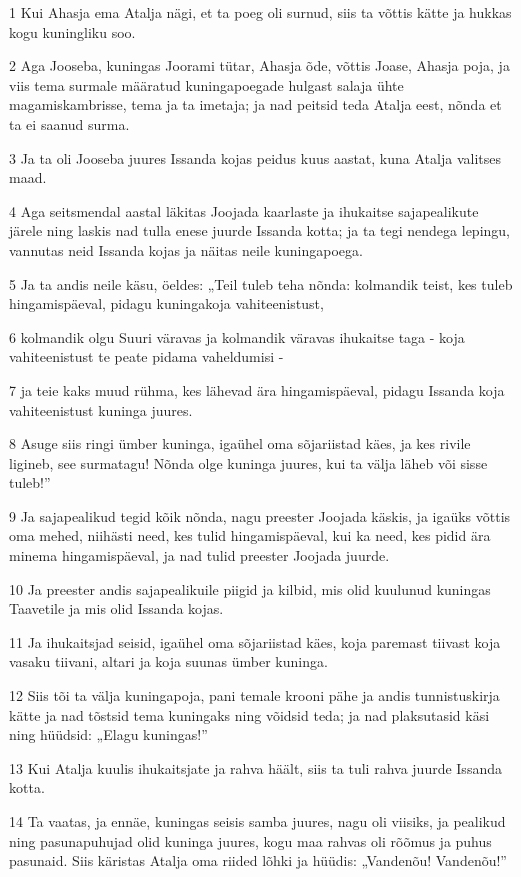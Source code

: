 \par 1 Kui Ahasja ema Atalja nägi, et ta poeg oli surnud, siis ta võttis kätte ja hukkas kogu kuningliku soo.
\par 2 Aga Jooseba, kuningas Joorami tütar, Ahasja õde, võttis Joase, Ahasja poja, ja viis tema surmale määratud kuningapoegade hulgast salaja ühte magamiskambrisse, tema ja ta imetaja; ja nad peitsid teda Atalja eest, nõnda et ta ei saanud surma.
\par 3 Ja ta oli Jooseba juures Issanda kojas peidus kuus aastat, kuna Atalja valitses maad.
\par 4 Aga seitsmendal aastal läkitas Joojada kaarlaste ja ihukaitse sajapealikute järele ning laskis nad tulla enese juurde Issanda kotta; ja ta tegi nendega lepingu, vannutas neid Issanda kojas ja näitas neile kuningapoega.
\par 5 Ja ta andis neile käsu, öeldes: „Teil tuleb teha nõnda: kolmandik teist, kes tuleb hingamispäeval, pidagu kuningakoja vahiteenistust,
\par 6 kolmandik olgu Suuri väravas ja kolmandik väravas ihukaitse taga - koja vahiteenistust te peate pidama vaheldumisi -
\par 7 ja teie kaks muud rühma, kes lähevad ära hingamispäeval, pidagu Issanda koja vahiteenistust kuninga juures.
\par 8 Asuge siis ringi ümber kuninga, igaühel oma sõjariistad käes, ja kes rivile ligineb, see surmatagu! Nõnda olge kuninga juures, kui ta välja läheb või sisse tuleb!”
\par 9 Ja sajapealikud tegid kõik nõnda, nagu preester Joojada käskis, ja igaüks võttis oma mehed, niihästi need, kes tulid hingamispäeval, kui ka need, kes pidid ära minema hingamispäeval, ja nad tulid preester Joojada juurde.
\par 10 Ja preester andis sajapealikuile piigid ja kilbid, mis olid kuulunud kuningas Taavetile ja mis olid Issanda kojas.
\par 11 Ja ihukaitsjad seisid, igaühel oma sõjariistad käes, koja paremast tiivast koja vasaku tiivani, altari ja koja suunas ümber kuninga.
\par 12 Siis tõi ta välja kuningapoja, pani temale krooni pähe ja andis tunnistuskirja kätte ja nad tõstsid tema kuningaks ning võidsid teda; ja nad plaksutasid käsi ning hüüdsid: „Elagu kuningas!”
\par 13 Kui Atalja kuulis ihukaitsjate ja rahva häält, siis ta tuli rahva juurde Issanda kotta.
\par 14 Ta vaatas, ja ennäe, kuningas seisis samba juures, nagu oli viisiks, ja pealikud ning pasunapuhujad olid kuninga juures, kogu maa rahvas oli rõõmus ja puhus pasunaid. Siis käristas Atalja oma riided lõhki ja hüüdis: „Vandenõu! Vandenõu!”
